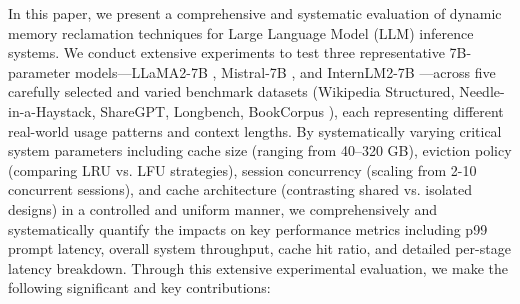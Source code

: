 \documentclass[sigconf,nonacm]{acmart}
\begin{document}
\par In this paper, we present a comprehensive and systematic evaluation of dynamic memory reclamation techniques for Large Language Model (LLM) inference systems. We conduct extensive experiments to test three representative 7B-parameter models—LLaMA2-7B \cite{touvron2023llama2}, Mistral-7B \cite{mistral2023}, and InternLM2-7B \cite{internlm2} —across five carefully selected and varied benchmark datasets (Wikipedia Structured\cite{wikidata}, Needle-in-a-Haystack\cite{needle}, ShareGPT\cite{sharegpt}, Longbench\cite{longbenchv2}, BookCorpus \cite{bookcorpus}), each representing different real-world usage patterns and context lengths. By systematically varying critical system parameters including cache size (ranging from 40–320 GB), eviction policy (comparing LRU vs. LFU strategies), session concurrency (scaling from 2-10 concurrent sessions), and cache architecture (contrasting shared vs. isolated designs) in a controlled and uniform manner, we comprehensively and systematically quantify the impacts on key performance metrics including p99 prompt latency, overall system throughput, cache hit ratio, and detailed per-stage latency breakdown. Through this extensive experimental evaluation, we make the following significant and key contributions:
\end{document}
